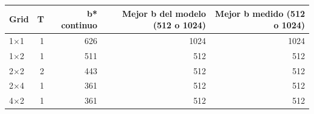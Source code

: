 \begin{tabular}{lrrrr}
\toprule
Grid & T & b* continuo & Mejor b del modelo (512 o 1024) & Mejor b medido (512 o 1024) \\
\midrule
1$\times$1 & 1 & 626 & 1024 & 1024 \\
1$\times$2 & 1 & 511 & 512 & 512 \\
2$\times$2 & 2 & 443 & 512 & 512 \\
2$\times$4 & 1 & 361 & 512 & 512 \\
4$\times$2 & 1 & 361 & 512 & 512 \\
\bottomrule
\end{tabular}
